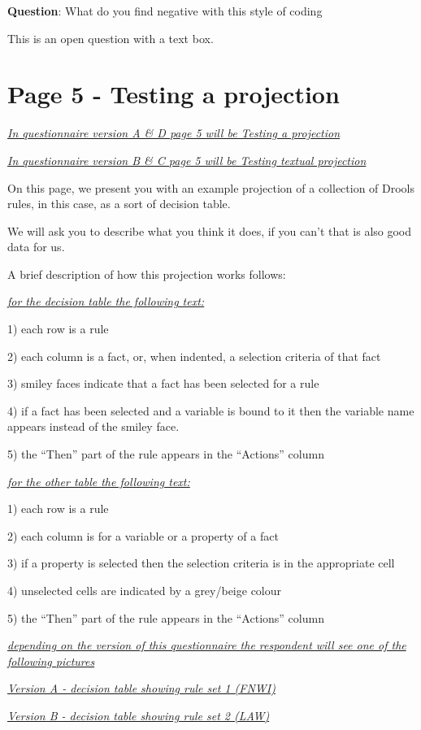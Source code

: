 \textbf{Question}: What do you find negative with this style of coding

This is an open question with a text box.

\section*{Page 5 - Testing a projection}
\emph{\underline{In questionnaire version A \& D page 5 will be Testing a projection}}

\emph{\underline{In questionnaire version B \& C page 5 will be Testing textual projection}}

On this page, we present you with an example projection of a collection of Drools rules, in this case, as a sort of decision table.

We will ask you to describe what you think it does, if you can't that is also good data for us.

A brief description of how this projection works follows:

\emph{\underline{for the decision table the following text:}}

1) each row is a rule

2) each column is a fact, or, when indented, a selection criteria of that fact

3) smiley faces indicate that a fact has been selected for a rule

4) if a fact has been selected and a variable is bound to it then the variable name appears instead of the smiley face.

5) the ``Then'' part of the rule appears in the ``Actions'' column

\emph{\underline{for the other table the following text:}}

1) each row is a rule

2) each column is for a variable or a property of a fact

3) if a property is selected then the selection criteria is in the appropriate cell

4) unselected cells are indicated by a grey/beige colour

5) the ``Then'' part of the rule appears in the ``Actions'' column


\emph{\underline{depending on the version of this questionnaire the respondent will see one of the following pictures}}

\emph{\underline{Version A - decision table showing rule set 1 (FNWI)}}

\emph{\underline{Version B - decision table showing rule set 2 (LAW)}}

